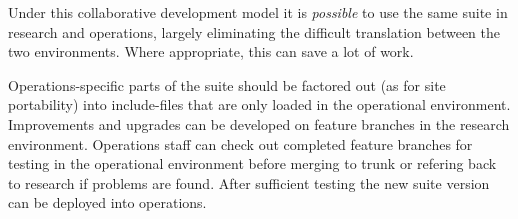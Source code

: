 Under this collaborative development model it is {\em possible} to use the
same suite in research and operations, largely eliminating the difficult
translation between the two environments. Where appropriate, this can save
a lot of work.

Operations-specific parts of the suite should be factored out (as for site
portability) into include-files that are only loaded in the operational
environment. Improvements and upgrades can be developed on feature branches in
the research environment. Operations staff can check out completed feature
branches for testing in the operational environment before merging to trunk or
refering back to research if problems are found. After sufficient testing the
new suite version can be deployed into operations.

